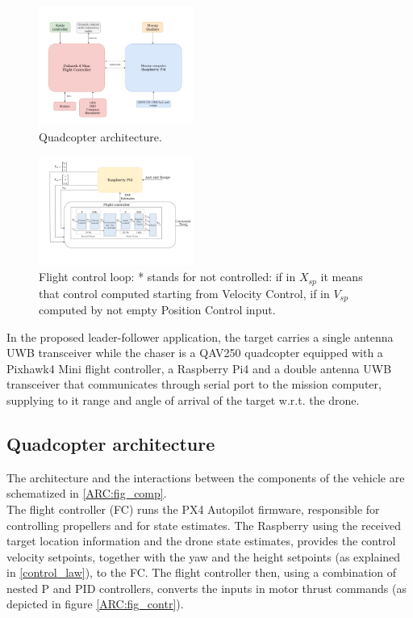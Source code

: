 \begin{figure}
    \centering
    \includegraphics[width=0.45\textwidth]{images/FCA.png}
    \caption{Quadcopter architecture.}
    \label{ARC:fig_comp}
\end{figure}

\begin{figure}
    \centering
    \includegraphics[width=0.45\textwidth]{images/Contr Diagram.png}
    \caption{Flight control loop: * stands for not controlled: if in \(X_{sp}\) it means that control computed starting from Velocity Control, if in \(V_{sp}\) computed by not empty Position Control input.}
    \label{ARC:fig_contr}
\end{figure}

In the proposed leader-follower application, the target carries a single antenna UWB transceiver while the chaser is a QAV250 quadcopter equipped with a Pixhawk4 Mini flight controller, a Raspberry Pi4 and a double antenna UWB transceiver that communicates through serial port to the mission computer, supplying to it range and angle of arrival of the target w.r.t. the drone.

\subsection{Quadcopter architecture}
The architecture and the interactions between the components of the vehicle are schematized in \autoref{ARC:fig_comp}.\\
The flight controller (FC) runs the PX4 Autopilot firmware, responsible for controlling propellers and for state estimates. The Raspberry using the received target location information and the drone state estimates, provides the control velocity setpoints, together with the yaw and the height setpoints (as explained in \autoref{control_law}), to the FC. The flight controller then, using a combination of nested P and PID controllers, converts the inputs in motor thrust commands (as depicted in figure \autoref{ARC:fig_contr}).\\


